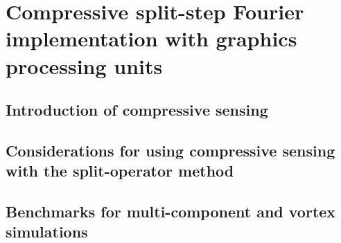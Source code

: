 
\chapter{Compressive split-step Fourier implementation with graphics processing units} \label{ch-cssfm}

\section{Introduction of compressive sensing}

\section{Considerations for using compressive sensing with the split-operator method}

\section{Benchmarks for multi-component and vortex simulations}
